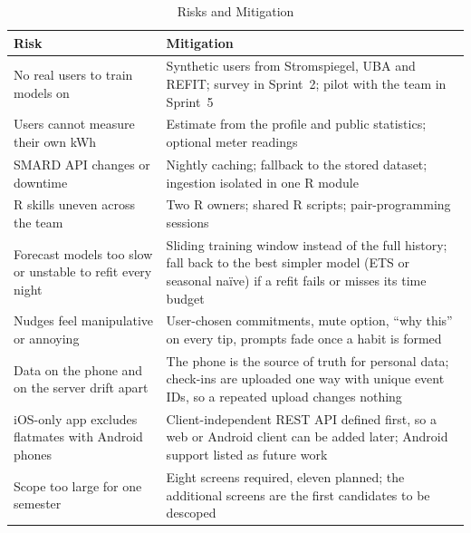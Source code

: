 \documentclass[conference]{IEEEtran}
\begin{document}
\begin{table}[!t]
\caption{Risks and Mitigation}
\label{tab:risks}
\centering
\footnotesize
\begin{tabular}{@{}L{3.3cm}L{5cm}@{}}
\toprule
Risk & Mitigation \\
\midrule
No real users to train models on & Synthetic users from Stromspiegel, UBA and REFIT; survey in Sprint~2; pilot with the team in Sprint~5 \\
Users cannot measure their own kWh & Estimate from the profile and public statistics; optional meter readings \\
SMARD API changes or downtime & Nightly caching; fallback to the stored dataset; ingestion isolated in one R module \\
R skills uneven across the team & Two R owners; shared R scripts; pair-programming sessions \\
Forecast models too slow or unstable to refit every night & Sliding training window instead of the full history; fall back to the best simpler model (ETS or seasonal na\"ive) if a refit fails or misses its time budget \\
Nudges feel manipulative or annoying & User-chosen commitments, mute option, ``why this'' on every tip, prompts fade once a habit is formed \\
Data on the phone and on the server drift apart & The phone is the source of truth for personal data; check-ins are uploaded one way with unique event IDs, so a repeated upload changes nothing \\
iOS-only app excludes flatmates with Android phones & Client-independent REST API defined first, so a web or Android client can be added later; Android support listed as future work \\
Scope too large for one semester & Eight screens required, eleven planned; the additional screens are the first candidates to be descoped \\
\bottomrule
\end{tabular}
\end{table}
\end{document}
